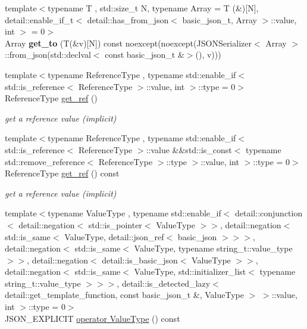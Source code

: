 \begin{DoxyCompactItemize}
\mbox{\label{classnlohmann_1_1basic__json_a8e29710c587ab852ba851b623d4efa00}} 
{\footnotesize template$<$typename T , std\+::size\+\_\+t N, typename Array  = T (\&)\mbox{[}\+N\mbox{]}, detail\+::enable\+\_\+if\+\_\+t$<$ detail\+::has\+\_\+from\+\_\+json$<$ basic\+\_\+json\+\_\+t, Array $>$\+::value, int $>$  = 0$>$ }\\Array {\bfseries get\+\_\+to} (T(\&v)\mbox{[}N\mbox{]}) const noexcept(noexcept(J\+S\+O\+N\+Serializer$<$ Array $>$\+::from\+\_\+json(std\+::declval$<$ const basic\+\_\+json\+\_\+t \&$>$(), v)))
\item 
{\footnotesize template$<$typename Reference\+Type , typename std\+::enable\+\_\+if$<$ std\+::is\+\_\+reference$<$ Reference\+Type $>$\+::value, int $>$\+::type  = 0$>$ }\\Reference\+Type \hyperlink{classnlohmann_1_1basic__json_a14ddc6e0f6d70296bc81f810254076c5}{get\+\_\+ref} ()
\begin{DoxyCompactList}\small\item\em get a reference value (implicit) \end{DoxyCompactList}\item 
{\footnotesize template$<$typename Reference\+Type , typename std\+::enable\+\_\+if$<$ std\+::is\+\_\+reference$<$ Reference\+Type $>$\+::value \&\&std\+::is\+\_\+const$<$ typename std\+::remove\+\_\+reference$<$ Reference\+Type $>$\+::type $>$\+::value, int $>$\+::type  = 0$>$ }\\Reference\+Type \hyperlink{classnlohmann_1_1basic__json_a7f0889072c54f1b899689ed6246238e7}{get\+\_\+ref} () const
\begin{DoxyCompactList}\small\item\em get a reference value (implicit) \end{DoxyCompactList}\item 
{\footnotesize template$<$typename Value\+Type , typename std\+::enable\+\_\+if$<$ detail\+::conjunction$<$ detail\+::negation$<$ std\+::is\+\_\+pointer$<$ Value\+Type $>$$>$, detail\+::negation$<$ std\+::is\+\_\+same$<$ Value\+Type, detail\+::json\+\_\+ref$<$ basic\+\_\+json $>$$>$$>$, detail\+::negation$<$ std\+::is\+\_\+same$<$ Value\+Type, typename string\+\_\+t\+::value\+\_\+type $>$$>$, detail\+::negation$<$ detail\+::is\+\_\+basic\+\_\+json$<$ Value\+Type $>$$>$, detail\+::negation$<$ std\+::is\+\_\+same$<$ Value\+Type, std\+::initializer\+\_\+list$<$ typename string\+\_\+t\+::value\+\_\+type $>$$>$$>$, detail\+::is\+\_\+detected\+\_\+lazy$<$ detail\+::get\+\_\+template\+\_\+function, const basic\+\_\+json\+\_\+t \&, Value\+Type $>$ $>$\+::value, int $>$\+::type  = 0$>$ }\\J\+S\+O\+N\+\_\+\+E\+X\+P\+L\+I\+C\+IT \hyperlink{classnlohmann_1_1basic__json_ada1463d8d7ba77865f28f5e83dec7f33}{operator Value\+Type} () const

\end{DoxyCompactItemize}
